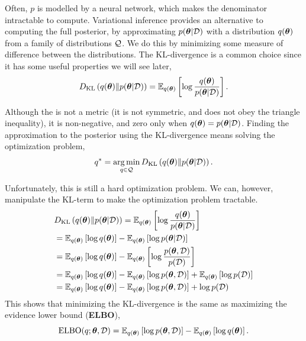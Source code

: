 \documentclass[twoside]{article}
\begin{document}
Often, \(p\) is modelled by a neural network, which makes the denominator
intractable to compute. Variational inference provides an alternative to
computing the full posterior, by approximating \(p(\boldsymbol \theta \vert \mathcal{D})\) with
a distribution \(q(\boldsymbol \theta)\) from a family of distributions \(\mathcal{Q}\). We
do this by minimizing some measure of difference between the distributions. The
KL-divergence is a common choice since it has some useful properties we will
see later,
\begin{equation*}
  D_{\mathrm{KL}}\left( q(\boldsymbol \theta) \middle\Vert p(\boldsymbol \theta \vert \mathcal{D}) \right) =
  \mathbb{E}_{q(\boldsymbol \theta)} \left[ \log \frac{q(\boldsymbol \theta)}{p(\boldsymbol \theta \vert \mathcal{D})} \right].
\end{equation*}

Although the is not a metric (it is not symmetric, and does not obey the
triangle inequality), it is non-negative, and zero only when
\(q(\boldsymbol \theta) = p(\boldsymbol \theta \vert \mathcal{D})\). Finding the approximation to the
posterior using the KL-divergence means solving the optimization problem,
\begin{equation*}
  q^* = \operatorname*{arg\,min}_{q \in \mathcal{Q}} D_{\mathrm{KL}}\left( q(\boldsymbol \theta) \middle\Vert p(\boldsymbol \theta \vert \mathcal{D}) \right).
\end{equation*}

Unfortunately, this is still a hard optimization problem. We can, however,
manipulate the KL-term to make the optimization problem tractable.
\begin{align*}
   & D_{\mathrm{KL}}\left( q(\boldsymbol \theta) \middle\Vert p(\boldsymbol \theta \vert \mathcal{D}) \right) =
  \mathbb{E}_{q(\boldsymbol \theta)} \left[ \log \frac{q(\boldsymbol \theta)}{p(\boldsymbol \theta \vert \mathcal{D})} \right]                     \\
   & = \mathbb{E}_{q(\boldsymbol \theta)} \left[ \log q(\boldsymbol \theta) \right] - \mathbb{E}_{q(\boldsymbol \theta)} \left[ \log p(\boldsymbol \theta \vert \mathcal{D}) \right] \\
   & = \mathbb{E}_{q(\boldsymbol \theta)} \left[ \log q(\boldsymbol \theta) \right] - \mathbb{E}_{q(\boldsymbol \theta)} \left[ \log
  \frac{p(\boldsymbol \theta, \mathcal{D})}{p(\mathcal{D})} \right]                                                \\
   & = \mathbb{E}_{q(\boldsymbol \theta)} \left[ \log q(\boldsymbol \theta) \right] - \mathbb{E}_{q(\boldsymbol \theta)} \left[ \log p(\boldsymbol \theta, \mathcal{D}) \right] +
  \mathbb{E}_{q(\boldsymbol \theta)} \left[ \log p(\mathcal{D}) \right]                                                      \\
   & = \mathbb{E}_{q(\boldsymbol \theta)} \left[ \log q(\boldsymbol \theta) \right] - \mathbb{E}_{q(\boldsymbol \theta)} \left[ \log p(\boldsymbol \theta, \mathcal{D}) \right] +
  \log p(\mathcal{D})                                                                      \\
\end{align*}
This shows that minimizing the KL-divergence is the same as maximizing the
evidence lower bound (\textbf{ELBO}),
\begin{equation*}
  \mathrm{ELBO}(q; \boldsymbol \theta, \mathcal{D}) = \mathbb{E}_{q(\boldsymbol \theta)} \left[ \log p(\boldsymbol \theta, \mathcal{D}) \right] -
  \mathbb{E}_{q(\boldsymbol \theta)} \left[ \log q(\boldsymbol \theta) \right].
\end{equation*}
\end{document}
